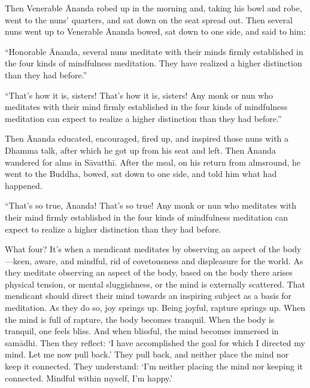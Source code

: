 \documentclass[12pt,openany]{book}%
\begin{document}
Then Venerable Ānanda robed up in the morning and, taking his bowl and robe, went to the nuns’ quarters, and sat down on the seat spread out. Then several nuns went up to Venerable Ānanda bowed, sat down to one side, and said to him: 

“Honorable Ānanda, several nuns meditate with their minds firmly established in the four kinds of mindfulness meditation. They have realized a higher distinction than they had before.” 

“That’s how it is, sisters! That’s how it is, sisters! Any monk or nun who meditates with their mind firmly established in the four kinds of mindfulness meditation can expect to realize a higher distinction than they had before.” 

Then Ānanda educated, encouraged, fired up, and inspired those nuns with a Dhamma talk, after which he got up from his seat and left. Then Ānanda wandered for alms in \textsanskrit{Sāvatthī}. After the meal, on his return from almsround, he went to the Buddha, bowed, sat down to one side, and told him what had happened. 

“That’s so true, Ānanda! That’s so true! Any monk or nun who meditates with their mind firmly established in the four kinds of mindfulness meditation can expect to realize a higher distinction than they had before. 

What four? It’s when a mendicant meditates by observing an aspect of the body—keen, aware, and mindful, rid of covetousness and displeasure for the world. As they meditate observing an aspect of the body, based on the body there arises physical tension, or mental sluggishness, or the mind is externally scattered. That mendicant should direct their mind towards an inspiring subject as a basis for meditation. As they do so, joy springs up. Being joyful, rapture springs up. When the mind is full of rapture, the body becomes tranquil. When the body is tranquil, one feels bliss. And when blissful, the mind becomes immersed in \textsanskrit{samādhi}. Then they reflect: ‘I have accomplished the goal for which I directed my mind. Let me now pull back.’ They pull back, and neither place the mind nor keep it connected. They understand: ‘I’m neither placing the mind nor keeping it connected. Mindful within myself, I’m happy.’ 
\end{document}
